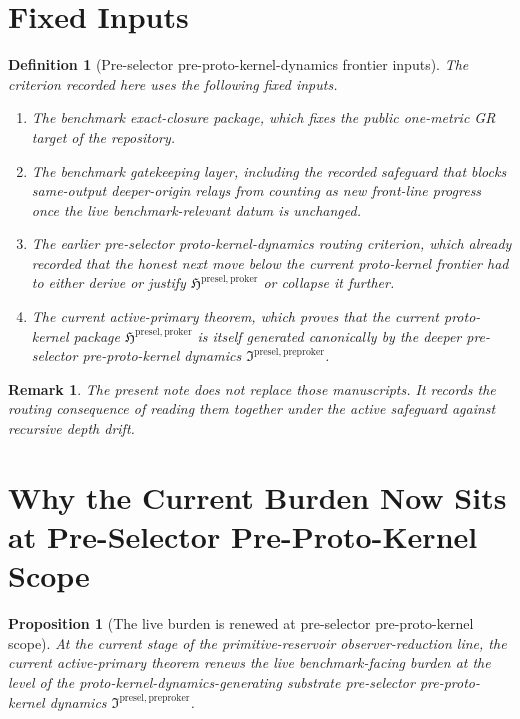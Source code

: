 \documentclass[11pt]{article}
\newcommand{\PreProtoKernelPackage}{\mathfrak I^{\mathrm{presel,preproker}}}
\newcommand{\ProtoKernelPackage}{\mathfrak H^{\mathrm{presel,proker}}}
\newtheorem{definition}{Definition}
\newtheorem{proposition}{Proposition}
\newtheorem{remark}{Remark}
\begin{document}
\section{Fixed Inputs}

\begin{definition}[Pre-selector pre-proto-kernel-dynamics frontier inputs]
The criterion recorded here uses the following fixed inputs.
\begin{enumerate}
    \item The benchmark exact-closure package, which fixes the public one-metric GR target of the repository.
    \item The benchmark gatekeeping layer, including the recorded safeguard that blocks same-output deeper-origin relays from counting as new front-line progress once the live benchmark-relevant datum is unchanged.
    \item The earlier pre-selector proto-kernel-dynamics routing criterion, which already recorded that the honest next move below the current proto-kernel frontier had to either derive or justify \(\ProtoKernelPackage\) or collapse it further.
    \item The current active-primary theorem, which proves that the current proto-kernel package \(\ProtoKernelPackage\) is itself generated canonically by the deeper pre-selector pre-proto-kernel dynamics \(\PreProtoKernelPackage\).
\end{enumerate}
\end{definition}

\begin{remark}
The present note does not replace those manuscripts. It records the routing consequence of reading them together under the active safeguard against recursive depth drift.
\end{remark}

\section{Why the Current Burden Now Sits at Pre-Selector Pre-Proto-Kernel Scope}

\begin{proposition}[The live burden is renewed at pre-selector pre-proto-kernel scope]
At the current stage of the primitive-reservoir observer-reduction line, the current active-primary theorem renews the live benchmark-facing burden at the level of the proto-kernel-dynamics-generating substrate pre-selector pre-proto-kernel dynamics \(\PreProtoKernelPackage\).
\end{proposition}
\end{document}
